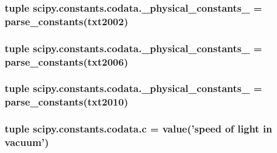 \subsubsection[{\+\_\+physical\+\_\+constants\+\_\+2002}]{\setlength{\rightskip}{0pt plus 5cm}tuple scipy.\+constants.\+codata.\+\_\+physical\+\_\+constants\+\_ = {\bf parse\+\_\+constants}({\bf txt2002})}\label{namespacescipy_1_1constants_1_1codata_a7fc09da5caed503365c60d0429019d97}
\hypertarget{namespacescipy_1_1constants_1_1codata_ad99a67e187dbee58d4c9199e80bf856a}{}
\subsubsection[{\+\_\+physical\+\_\+constants\+\_\+2006}]{\setlength{\rightskip}{0pt plus 5cm}tuple scipy.\+constants.\+codata.\+\_\+physical\+\_\+constants\+\_ = {\bf parse\+\_\+constants}({\bf txt2006})}\label{namespacescipy_1_1constants_1_1codata_ad99a67e187dbee58d4c9199e80bf856a}
\hypertarget{namespacescipy_1_1constants_1_1codata_a105fd8b3347c3b247d23c97c384a1815}{}
\subsubsection[{\+\_\+physical\+\_\+constants\+\_\+2010}]{\setlength{\rightskip}{0pt plus 5cm}tuple scipy.\+constants.\+codata.\+\_\+physical\+\_\+constants\+\_ = {\bf parse\+\_\+constants}({\bf txt2010})}\label{namespacescipy_1_1constants_1_1codata_a105fd8b3347c3b247d23c97c384a1815}
\hypertarget{namespacescipy_1_1constants_1_1codata_a34f27fcdaeb8d0516ce3f92669bd12dc}{}
\subsubsection[{c}]{\setlength{\rightskip}{0pt plus 5cm}tuple scipy.\+constants.\+codata.\+c = {\bf value}('speed of light in vacuum')}\label{namespacescipy_1_1constants_1_1codata_a34f27fcdaeb8d0516ce3f92669bd12dc}
\hypertarget{namespacescipy_1_1constants_1_1codata_a51d9bf3362bbbc2576e1aeef550ed695}{}
